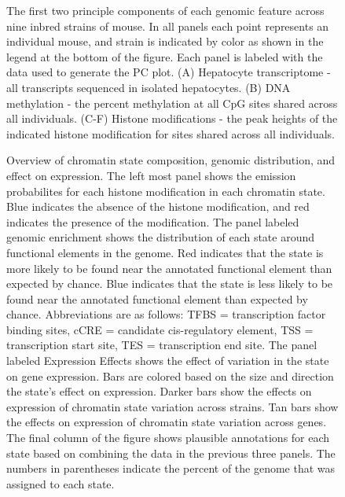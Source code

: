 \documentclass[10pt,letterpaper]{article}
\begin{document}
\begin{figure}[ht]
\centering
\caption{The first two principle components of each genomic feature across
nine inbred strains of mouse. In all panels each point represents
an individual mouse, and strain is indicated by color as shown in
the legend at the bottom of the figure. Each panel is labeled with
the data used to generate the PC plot. (A) Hepatocyte transcriptome - 
all transcripts sequenced in isolated hepatocytes. (B) DNA methylation - 
the percent methylation at all CpG sites shared across all individuals. 
(C-F) Histone modifications - the peak heights of the indicated histone
modification for sites shared across all individuals.}
\label{fig:pc_plots}
\end{figure}

\begin{figure}[ht]
\centering
\caption{Overview of chromatin state composition, genomic distribution,
and effect on expression. The left most panel shows the emission
probabilites for each histone modification in each chromatin state. 
Blue indicates the absence of the histone modification, and red 
indicates the presence of the modification. The panel labeled
genomic enrichment shows the distribution of each state around 
functional elements in the genome. Red indicates that the
state is more likely to be found near the annotated functional 
element than expected by chance. Blue indicates that the state
is less likely to be found near the annotated functional element
than expected by chance. Abbreviations are as follows: TFBS = 
transcription factor binding sites, cCRE = candidate cis-regulatory
element, TSS = transcription start site, 
TES = transcription end site. The panel labeled Expression Effects 
shows the effect of variation in the state on gene expression. 
Bars are colored based on the size and direction the state's effect on
expression. Darker bars show the effects on expression of chromatin 
state variation across strains. Tan bars show the effects on expression
of chromatin state variation across genes. The final column of the figure 
shows plausible annotations for each state based on combining the data in 
the previous three panels. The numbers in parentheses indicate the percent 
of the genome that was assigned to each state.}
\label{fig:state_overview}
\end{figure}
\end{document}
